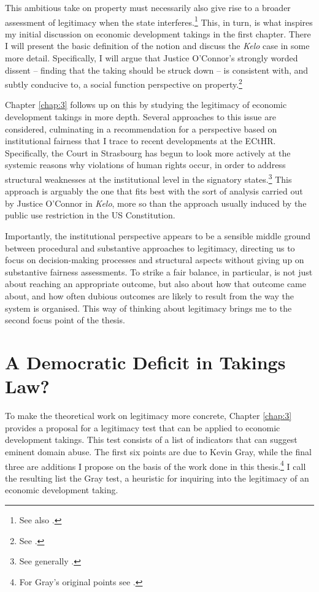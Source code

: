 This ambitious take on property must necessarily also give rise to a broader assessment of legitimacy when the state interferes.\footnote{See also \cite{underkuffler06}.} This, in turn, is what inspires my initial discussion on economic development takings in the first chapter. There I will present the basic definition of the notion and discuss the {\it Kelo} case in some more detail. Specifically, I will argue that Justice O'Connor's strongly worded dissent -- finding that the taking should be struck down -- is consistent with, and subtly conducive to, a social function perspective on property.\footnote{See \cite[494-505]{kelo05}.}

Chapter \ref{chap:3} follows up on this by studying the legitimacy of economic development takings in more depth. Several approaches to this issue are considered, culminating in a recommendation for a perspective based on institutional fairness that I trace to recent developments at the ECtHR. Specifically, the Court in Strasbourg has begun to look more actively at the systemic reasons why violations of human rights occur, in order to address structural weaknesses at the institutional level in the signatory states.\footnote{See generally \cite{leach10}.} This approach is arguably the one that fits best with the sort of analysis carried out by Justice O'Connor in {\it Kelo}, more so than the approach usually induced by the public use restriction in the US Constitution.

Importantly, the institutional perspective appears to be a sensible middle ground between procedural and substantive approaches to legitimacy, directing us to focus on decision-making processes and structural aspects without giving up on substantive fairness assessments. To strike a fair balance, in particular, is not just about reaching an appropriate outcome, but also about how that outcome came about, and how often dubious outcomes are likely to result from the way the system is organised. This way of thinking about legitimacy brings me to the second focus point of the thesis.

\section{A Democratic Deficit in Takings Law?}\label{sec:1:2}

To make the theoretical work on legitimacy more concrete, Chapter \ref{chap:3} provides a proposal for a legitimacy test that can be applied to economic development takings. This test consists of a list of indicators that can suggest eminent domain abuse. The first six points are due to Kevin Gray, while the final three are additions I propose on the basis of the work done in this thesis.\footnote{For Gray's original points see \cite{gray11}.} I call the resulting list the Gray test, a heuristic for inquiring into the legitimacy of an economic development taking.

